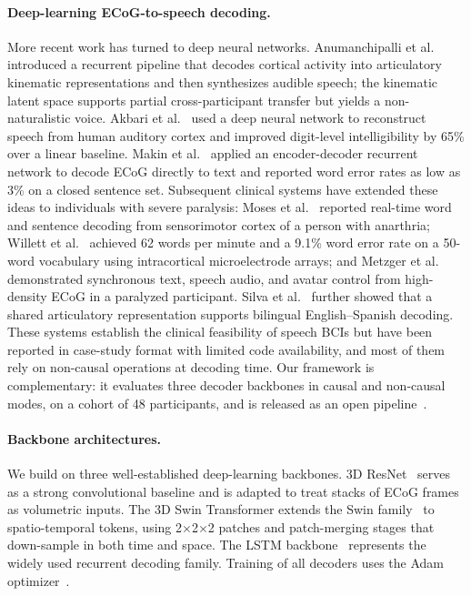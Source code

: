 \paragraph{Deep-learning ECoG-to-speech decoding.}
More recent work has turned to deep neural networks. Anumanchipalli et al.~\cite{anumanchipalli2019speech} introduced a recurrent pipeline that decodes cortical activity into articulatory kinematic representations and then synthesizes audible speech; the kinematic latent space supports partial cross-participant transfer but yields a non-naturalistic voice. Akbari et al.~\cite{akbari2019towards} used a deep neural network to reconstruct speech from human auditory cortex and improved digit-level intelligibility by 65\% over a linear baseline. Makin et al.~\cite{makin2020machine} applied an encoder-decoder recurrent network to decode ECoG directly to text and reported word error rates as low as 3\% on a closed sentence set. Subsequent clinical systems have extended these ideas to individuals with severe paralysis: Moses et al.~\cite{moses2021neuroprosthesis} reported real-time word and sentence decoding from sensorimotor cortex of a person with anarthria; Willett et al.~\cite{willett2023highperformance} achieved 62 words per minute and a 9.1\% word error rate on a 50-word vocabulary using intracortical microelectrode arrays; and Metzger et al.~\cite{metzger2023highperformance} demonstrated synchronous text, speech audio, and avatar control from high-density ECoG in a paralyzed participant. Silva et al.~\cite{silva2024bilingual} further showed that a shared articulatory representation supports bilingual English--Spanish decoding. These systems establish the clinical feasibility of speech BCIs but have been reported in case-study format with limited code availability, and most of them rely on non-causal operations at decoding time. Our framework is complementary: it evaluates three decoder backbones in causal and non-causal modes, on a cohort of 48 participants, and is released as an open pipeline~\cite{anumanchipalli2019speech,makin2020machine,moses2021neuroprosthesis,metzger2023highperformance,silva2024bilingual}.

\paragraph{Backbone architectures.}
We build on three well-established deep-learning backbones. 3D ResNet~\cite{he2016deep} serves as a strong convolutional baseline and is adapted to treat stacks of ECoG frames as volumetric inputs. The 3D Swin Transformer extends the Swin family~\cite{liu2021swin,liu2022video} to spatio-temporal tokens, using 2$\times$2$\times$2 patches and patch-merging stages that down-sample in both time and space. The LSTM backbone~\cite{hochreiter1997lstm} represents the widely used recurrent decoding family. Training of all decoders uses the Adam optimizer~\cite{kingma2015adam}.

